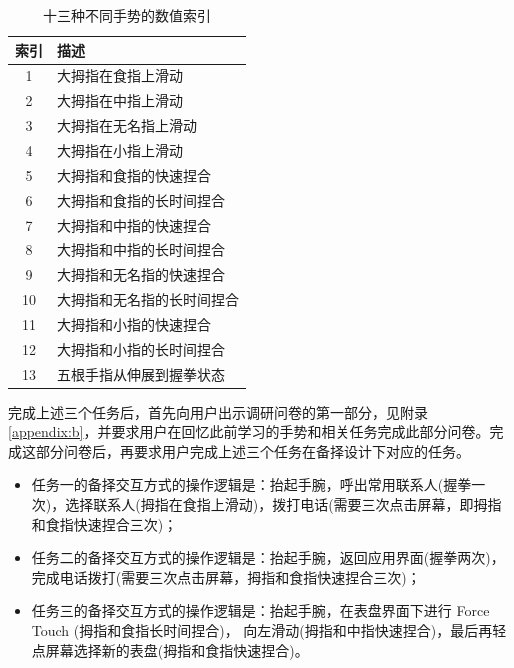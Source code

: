 \begin{table}[H]
    \small
    \kaishu
    \centering
    \setlength{\belowcaptionskip}{10pt}
    \caption{十三种不同手势的数值索引}

    \begin{tabular}{c l}
        \toprule
        \textbf{索引}        & \textbf{描述} \\
        \hline
        1     & 大拇指在食指上滑动 \\
        2     & 大拇指在中指上滑动 \\
        3     & 大拇指在无名指上滑动 \\
        4     & 大拇指在小指上滑动 \\
        5     & 大拇指和食指的快速捏合 \\
        6     & 大拇指和食指的长时间捏合 \\
        7     & 大拇指和中指的快速捏合 \\
        8     & 大拇指和中指的长时间捏合  \\
        9     & 大拇指和无名指的快速捏合  \\
        10    & 大拇指和无名指的长时间捏合 \\
        11    & 大拇指和小指的快速捏合 \\
        12    & 大拇指和小指的长时间捏合 \\
        13    & 五根手指从伸展到握拳状态 \\
        \bottomrule
    \end{tabular}

    \label{table:gesture}
\end{table}

完成上述三个任务后，首先向用户出示调研问卷的第一部分，见附录\ref{appendix:b}，并要求用户在回忆此前学习的手势和相关任务完成此部分问卷。完成这部分问卷后，再要求用户完成上述三个任务在备择设计下对应的任务。

\begin{itemize}
    \kaishu
    \item 任务一的备择交互方式的操作逻辑是：抬起手腕，呼出常用联系人(握拳一次)，选择联系人(拇指在食指上滑动)，拨打电话(需要三次点击屏幕，即拇指和食指快速捏合三次)；
    \item 任务二的备择交互方式的操作逻辑是：抬起手腕，返回应用界面(握拳两次)，完成电话拨打(需要三次点击屏幕，拇指和食指快速捏合三次)；
    \item 任务三的备择交互方式的操作逻辑是：抬起手腕，在表盘界面下进行 Force Touch (拇指和食指长时间捏合)， 向左滑动(拇指和中指快速捏合)，最后再轻点屏幕选择新的表盘(拇指和食指快速捏合)。
\end{itemize}

